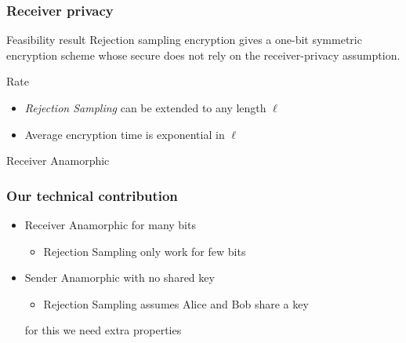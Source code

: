 \documentclass[handout]{beamer}
\begin{document}
\begin{frame}
\frametitle{Receiver privacy}

\begin{block}{Feasibility result}
{\color{brown} 
Rejection sampling encryption gives a one-bit symmetric
encryption scheme whose secure does not rely on the receiver-privacy
assumption.
}

\end{block}

\pause
\vfill
\begin{block}{Rate}

\begin{itemize}
\item {\em \color{brown} Rejection Sampling} can be extended to any length $\ell$ 
\item Average encryption time is exponential in $\ell$
\end{itemize}
\end{block}
\pause
\vfill
{\color{purple} Receiver Anamorphic}
\end{frame}

\begin{frame}
\frametitle{Our technical contribution}

\begin{itemize}
\item  {\color{purple} Receiver Anamorphic} for many bits
    \begin{itemize}
        \item Rejection Sampling only work for few bits
    \end{itemize}
    \vskip 2cm
\item  {\color{purple} Sender Anamorphic} with no shared key
    \begin{itemize}
        \item Rejection Sampling assumes Alice and Bob share a key
    \end{itemize}
    for this we need extra properties 
\end{itemize}
\end{frame}
\end{document}
